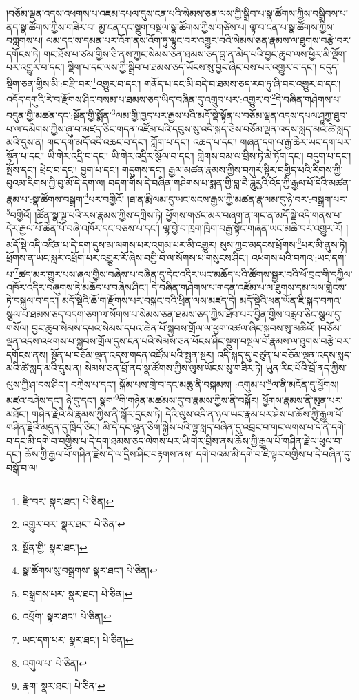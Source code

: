 །བཅོམ་ལྡན་འདས་འཕགས་པ་འཇམ་དཔལ་དུས་ངན་པའི་སེམས་ཅན་ལས་ཀྱི་སྒྲིབ་པ་སྣ་ཚོགས་ཀྱིས་བསྒྲིབས་པ། ནད་སྣ་ཚོགས་ཀྱིས་གཟིར་བ། མྱ་ངན་དང་སྡུག་བསྔལ་སྣ་ཚོགས་ཀྱིས་གཙེས་པ། ལྟ་བ་ངན་པ་སྣ་ཚོགས་ཀྱིས་བཀླགས་པ། ལམ་དང་ས་དམན་པར་འོག་ནས་འོག་ཏུ་ལྟུང་བར་འགྱུར་བའི་སེམས་ཅན་རྣམས་ལ་ཐུགས་བརྩེ་བར་དགོངས་ཏེ། གང་ཐོས་པ་ཙམ་གྱིས་ཅི་ནས་ཀྱང་སེམས་ཅན་ཐམས་ཅད་བླ་ན་མེད་པའི་བྱང་ཆུབ་ལས་ཕྱིར་མི་ལྡོག་པར་འགྱུར་བ་དང་། སྡིག་པ་དང་ལས་ཀྱི་སྒྲིབ་པ་ཐམས་ཅད་ཡོངས་སུ་བྱང་ཞིང་བས་པར་འགྱུར་བ་དང་། བདུད་སྡིག་ཅན་གྱིས་མི་:བརྫི་བར་\footnote{རྫི་བར་  སྣར་ཐང་།  པེ་ཅིན། }འགྱུར་བ་དང་། གནོད་པ་དང་མི་བདེ་བ་ཐམས་ཅད་རབ་ཏུ་ཞི་བར་འགྱུར་བ་དང་། འདོད་དགུའི་རེ་བ་རྫོགས་ཤིང་བསམ་པ་ཐམས་ཅད་ཡིད་བཞིན་དུ་འགྲུབ་པར་:འགྱུར་བ་\footnote{འགྱུར་བར་  སྣར་ཐང་།  པེ་ཅིན། }དེ་བཞིན་གཤེགས་པ་བདུན་གྱི་མཚན་དང་:སྔོན་གྱི་སྨོན་\footnote{སྔོན་གྱི་  སྣར་ཐང་། }ལམ་གྱི་ཁྱད་པར་རྒྱས་པའི་མདོ་སྡེ་སྟོན་པ་བཅོམ་ལྡན་འདས་དཔལ་ཤཱཀྱ་ཐུབ་པ་ལ་དམིགས་ཀྱིས་ཞུ་བ་མཛད་ཅིང་གདན་འཛོམ་པའི་དབུས་སུ་འདི་སྐད་ཅེས་བཅོམ་ལྡན་འདས་སླད་མའི་ཚེ་སླད་མའི་དུས་ན། གང་དག་མདོ་འདི་འཆང་བ་དང་། ཀློག་པ་དང་། འཆད་པ་དང་། གཞན་དག་ལ་རྒྱ་ཆེར་ཡང་དག་པར་སྟོན་པ་དང་། ཡི་གེར་འདྲི་བ་དང་། ཡི་གེར་འདྲིར་སྩོལ་བ་དང་། གླེགས་བམ་ལ་བྲིས་ཏེ་མེ་ཏོག་དང་། བདུག་པ་དང་། སྤོས་དང་། ཕྲེང་བ་དང་། བྱུག་པ་དང་། གདུགས་དང་། རྒྱལ་མཚན་རྣམས་ཀྱིས་བཀུར་སྟིར་བགྱིད་པའི་རིགས་ཀྱི་བུའམ་རིགས་ཀྱི་བུ་མོ་དེ་དག་ལ། བདག་གིས་དེ་བཞིན་གཤེགས་པ་སྨན་གྱི་བླ་བཻ་ཌཱུརྱའི་འོད་ཀྱི་རྒྱལ་པོ་དེའི་མཚན་རྣམ་པ་:སྣ་ཚོགས་བསྒྲག་\footnote{སྣ་ཚོགས་སུ་བསྒྲགས་  སྣར་ཐང་།  པེ་ཅིན། }པར་བགྱིའོ། །ཐ་ན་རྨི་ལམ་དུ་ཡང་སངས་རྒྱས་ཀྱི་མཚན་རྣ་ལམ་དུ་ཉེ་བར་:བསྒྲག་པར་\footnote{བསྒྲགས་པར་  སྣར་ཐང་།  པེ་ཅིན། }བགྱིའོ། །ཚོན་སྣ་ལྔ་པའི་རས་རྣམས་ཀྱིས་དཀྲིས་ཏེ། ཕྱོགས་གཙང་མར་བཞག་ན་གང་ན་མདོ་སྡེ་འདི་གནས་པ་དེར་རྒྱལ་པོ་ཆེན་པོ་བཞི་འཁོར་དང་བཅས་པ་དང་། ལྷ་བྱེ་བ་ཁྲག་ཁྲིག་བརྒྱ་སྟོང་གཞན་ཡང་མཆི་བར་འགྱུར་རོ། །མདོ་སྡེ་འདི་འཛིན་པ་དེ་དག་དུས་མ་ལགས་པར་འགུམ་པར་མི་འགྱུར། སུས་ཀྱང་མདངས་ཕྲོགས་\footnote{འཕྲོག་  སྣར་ཐང་།  པེ་ཅིན། }པར་མི་ནུས་ཏེ། ཕྲོགས་ན་ཡང་སླར་འཕྲོག་པར་འགྱུར་རོ་ཞེས་བགྱི་བ་ལ་སོགས་པ་གསུངས་ཤིང་། འཕགས་པའི་བཀའ་:ཡང་དག་པ་\footnote{ཡང་དག་པར་  སྣར་ཐང་།  པེ་ཅིན། }ཚད་མར་གྱུར་པས་ཞལ་གྱིས་བཞེས་པ་བཞིན་དུ་དེང་འདིར་ཡང་མཆོད་པའི་ཚོགས་སྦྱར་བའི་ཕོ་བྲང་གི་དཀྱིལ་འཁོར་འདིར་བཞུགས་ཏེ་མཆོད་པ་བཞེས་ཤིང་། དེ་བཞིན་གཤེགས་པ་གདན་འཛོམ་པ་ལ་ཐུགས་དམ་ལས་གླེངས་ཏེ་བསྐུལ་བ་དང་། མདོ་སྡེའི་ཆོ་ག་རྫོགས་པར་བསྐང་བའི་ཕྲིན་ལས་མཛད་དེ། མདོ་སྡེའི་ཕན་ཡོན་ཇི་སྐད་བཀའ་སྩལ་པ་ཐམས་ཅད་བདག་ཅག་ལ་སོགས་པ་སེམས་ཅན་ཐམས་ཅད་ཀྱིས་ཐོབ་པར་བྱིན་གྱིས་བརླབ་ཅིང་སྩལ་དུ་གསོལ། བྱང་ཆུབ་སེམས་དཔའ་སེམས་དཔའ་ཆེན་པོ་སྐྱབས་གྲོལ་ལ་ཕྱག་འཚལ་ཞིང་སྐྱབས་སུ་མཆིའོ། །བཅོམ་ལྡན་འདས་འཕགས་པ་སྐྱབས་གྲོལ་དུས་ངན་པའི་སེམས་ཅན་ཕོངས་ཤིང་སྡུག་བསྔལ་བ་རྣམས་ལ་ཐུགས་བརྩེ་བར་དགོངས་ནས། སྟོན་པ་བཅོམ་ལྡན་འདས་གདན་འཛོམ་པའི་སྤྱན་སྔར། འདི་སྐད་དུ་བཙུན་པ་བཅོམ་ལྡན་འདས་སླད་མའི་ཚེ་སླད་མའི་དུས་ན། སེམས་ཅན་བྲོ་ནད་སྣ་ཚོགས་ཀྱིས་ལུས་ཡོངས་སུ་གཟིར་ཏེ། ཡུན་རིང་པོའི་བྲོ་ནད་ཀྱིས་ལུས་ཀྱི་ཤ་བས་ཤིང་། བཀྲེས་པ་དང་། སྐོམ་པས་གྲེ་བ་དང་མཆུ་ནི་བསྐམས། :འགུམ་པ་\footnote{འགུལ་པ་  པེ་ཅིན། }ལ་ནི་མངོན་དུ་ཕྱོགས། མཛའ་བཤེས་དང་། ཉེ་དུ་དང་། སྣག་\footnote{རྣག་  སྣར་ཐང་།  པེ་ཅིན། }གི་གཉེན་མཚམས་དུ་བ་རྣམས་ཀྱིས་ནི་བསྐོར། ཕྱོགས་རྣམས་ནི་མུན་པར་མཐོང་། གཤིན་རྗེའི་མི་རྣམས་ཀྱིས་ནི་སྒོར་དྲངས་ཏེ། དེའི་ལུས་འདི་ན་ཉལ་ཡང་རྣམ་པར་ཤེས་པ་ཆོས་ཀྱི་རྒྱལ་པོ་གཤིན་རྗེའི་མདུན་དུ་ཁྲིད་ཅིང་། མི་དེ་དང་ལྷན་ཅིག་སྐྱེས་པའི་ལྷ་སླད་བཞིན་དུ་འབྲང་བ་གང་ལགས་པ་དེ་ནི་དགེ་བ་དང་མི་དགེ་བ་བགྱིས་པ་དེ་དག་ཐམས་ཅད་ལེགས་པར་ཡི་གེར་བྲིས་ནས་ཆོས་ཀྱི་རྒྱལ་པོ་གཤིན་རྗེ་ལ་ཕུལ་བ་དང་། ཆོས་ཀྱི་རྒྱལ་པོ་གཤིན་རྗེས་དེ་ལ་དྲིས་ཤིང་བརྟགས་ནས། དགེ་བའམ་མི་དགེ་བ་ཇི་ལྟར་བགྱིས་པ་དེ་བཞིན་དུ་བསྒོ་བ་ལ། 